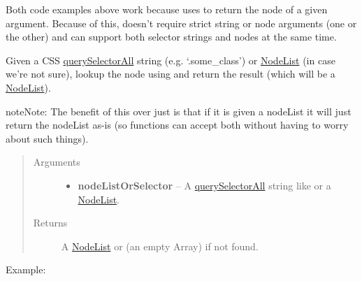 \documentclass[letterpaper,10pt,openany]{sphinxmanual}
\begin{document}
\begin{fulllineitems}
\begin{fulllineitems}
\begin{fulllineitems}
Both code examples above work because  uses {\hyperref[Developer/js_gateone:GateOne.Utils.getNode]{}} to return the node of a given argument.  Because of this,  doesn't require strict string or node arguments (one or the other) and can support both selector strings and nodes at the same time.

\end{fulllineitems}



\begin{fulllineitems}
\label{Developer/js_gateone:GateOne.Utils.getNodes}
Given a CSS \href{https://developer.mozilla.org/en-US/docs/DOM/Document.querySelectorAll}{querySelectorAll} string (e.g. `.some\_class') or \href{https://developer.mozilla.org/En/DOM/NodeList}{NodeList} (in case we're not sure), lookup the node using  and return the result (which will be a \href{https://developer.mozilla.org/En/DOM/NodeList}{NodeList}).

\begin{notice}{note}{Note:}
The benefit of this over just  is that if it is given a nodeList it will just return the nodeList as-is (so functions can accept both without having to worry about such things).
\end{notice}
\begin{quote}\begin{description}
\item[{Arguments}] \leavevmode\begin{itemize}
\item {} 
\textbf{nodeListOrSelector} -- 
A \href{https://developer.mozilla.org/en-US/docs/DOM/Document.querySelectorAll}{querySelectorAll} string like  or a \href{https://developer.mozilla.org/En/DOM/NodeList}{NodeList}.


\end{itemize}

\item[{Returns}] \leavevmode

A \href{https://developer.mozilla.org/En/DOM/NodeList}{NodeList} or \code{{[}{]}} (an empty Array) if not found.


\end{description}\end{quote}

Example:


\end{fulllineitems}
\end{fulllineitems}
\end{fulllineitems}
\end{document}
